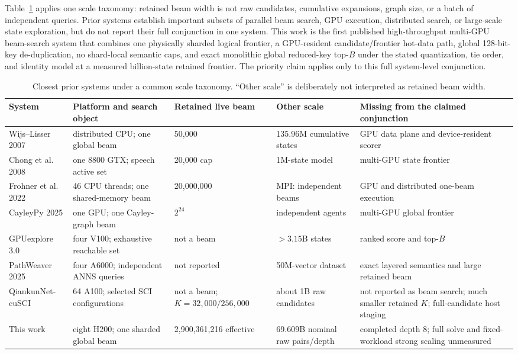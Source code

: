 \documentclass[10pt,twocolumn]{article}
\begin{document}
Table~\ref{tab:prior_art} applies one scale taxonomy: retained beam width is not
raw candidates, cumulative expansions, graph size, or a batch of independent
queries.  Prior systems establish important subsets of parallel beam search,
GPU execution, distributed search, or large-scale state exploration, but do
not report their full conjunction in one system.  This work is the first
published high-throughput multi-GPU beam-search system that combines one
physically sharded logical frontier, a GPU-resident candidate/frontier hot-data
path, global 128-bit-key de-duplication, no shard-local semantic caps, and exact
monolithic global reduced-key top-$B$ under the stated quantization, tie order,
and identity model at a measured billion-state retained frontier. The priority
claim applies only to this full system-level conjunction.

\begin{table}[t]
\centering
\footnotesize
\caption{Closest prior systems under a common scale taxonomy.  ``Other scale''
is deliberately not interpreted as retained beam width.}
\label{tab:prior_art}
\setlength{\tabcolsep}{2.5pt}
\begin{tabular}{@{}p{2.7cm}p{3.7cm}p{3.0cm}p{3.0cm}p{4.2cm}@{}}
\toprule
System & Platform and search object & Retained live beam & Other scale & Missing from the claimed conjunction \\
\midrule
Wijs--Lisser 2007 & distributed CPU; one global beam & 50,000 & 135.96M cumulative states & GPU data plane and device-resident scorer \\
Chong et al. 2008 & one 8800 GTX; speech active set & 20,000 cap & 1M-state model & multi-GPU state frontier \\
Frohner et al. 2022 & 46 CPU threads; one shared-memory beam & 20,000,000 & MPI: independent beams & GPU and distributed one-beam execution \\
CayleyPy 2025 & one GPU; one Cayley-graph beam & $2^{24}$ & independent agents & multi-GPU global frontier \\
GPUexplore 3.0 & four V100; exhaustive reachable set & not a beam & $>3.15$B states & ranked score and top-$B$ \\
PathWeaver 2025 & four A6000; independent ANNS queries & not reported & 50M-vector dataset & exact layered semantics and large retained beam \\
QiankunNet-cuSCI & 64 A100; selected SCI configurations & not a beam; $K=32{,}000/256{,}000$ & about 1B raw candidates & not reported as beam search; much smaller retained $K$; full-candidate host staging \\
This work & eight H200; one sharded global beam & 2,900,361,216 effective & 69.609B nominal raw pairs/depth & completed depth 8; full solve and fixed-workload strong scaling unmeasured \\
\bottomrule
\end{tabular}
\end{table}
\end{document}
